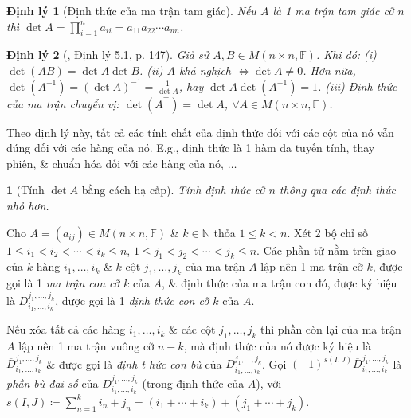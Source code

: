 \documentclass{article}
\newtheorem{baitoan}{}
\newtheorem{dinhly}{Định lý}
\begin{document}
\begin{dinhly}[Định thức của ma trận tam giác]
	Nếu $A$ là 1 ma trận tam giác cỡ $n$ thì $\det A = \prod_{i=1}^n a_{ii} = a_{11}a_{22}\cdots a_{nn}$.
\end{dinhly}

\begin{dinhly}[\cite{Hung_linear_algebra}, Định lý 5.1, p. 147]
	Giả sử $A,B\in M(n\times n,\mathbb{F})$. Khi đó: (i) $\det(AB) = \det A\det B$. (ii) $A$ khả nghịch $\Leftrightarrow\det A\ne0$. Hơn nữa, $\det(A^{-1}) = (\det A)^{-1} = \frac{1}{\det A}$, hay $\det A\det(A^{-1}) = 1$. (iii) Định thức của ma trận chuyển vị: $\det(A^\top) = \det A$, $\forall A\in M(n\times n,\mathbb{F})$.
\end{dinhly}
Theo định lý này, tất cả các tính chất của định thức đối với các cột của nó vẫn đúng đối với các hàng của nó. E.g., định thức là 1 hàm đa tuyến tính, thay phiên, \& chuẩn hóa đối với các hàng của nó, $\ldots$

\begin{baitoan}[Tính $\det A$ bằng cách hạ cấp]
	Tính định thức cỡ $n$ thông qua các định thức nhỏ hơn.
\end{baitoan}
Cho $A = (a_{ij})\in M(n\times n,\mathbb{F})$ \& $k\in\mathbb{N}$ thỏa $1\le k < n$. Xét 2 bộ chỉ số $1\le i_1 < i_2 < \cdots < i_k\le n$, $1\le j_1 < j_2 < \cdots < j_k\le n$. Các phần tử nằm trên giao của $k$ hàng $i_1,\ldots,i_k$ \& $k$ cột $j_1,\ldots,j_k$ của ma trận $A$ lập nên 1 ma trận cỡ $k$, được gọi là 1 {\it ma trận con cỡ $k$} của $A$, \& định thức của ma trận con đó, được ký hiệu là $D_{i_1,\ldots,i_k}^{j_1,\ldots,j_k}$, được gọi là 1 {\it định thức con cỡ $k$} của $A$.

Nếu xóa tất cả các hàng $i_1,\ldots,i_k$ \& các cột $j_1,\ldots,j_k$ thì phần còn lại của ma trận $A$ lập nên 1 ma trận vuông cỡ $n - k$, mà định thức của nó được ký hiệu là $\overline{D}_{i_1,\ldots,i_k}^{j_1,\ldots,j_k}$ \& được gọi là {\it định t hức con bù} của $D_{i_1,\ldots,i_k}^{j_1,\ldots,j_k}$. Gọi $(-1)^{s(I,J)}\overline{D}_{i_1,\ldots,i_k}^{j_1,\ldots,j_k}$ là {\it phần bù đại số} của $D_{i_1,\ldots,i_k}^{j_1,\ldots,j_k}$ (trong định thức của $A$), với $s(I,J)\coloneqq\sum_{n=1}^k i_n + j_n = (i_1 + \cdots + i_k) + (j_1 + \cdots + j_k)$.
\end{document}
